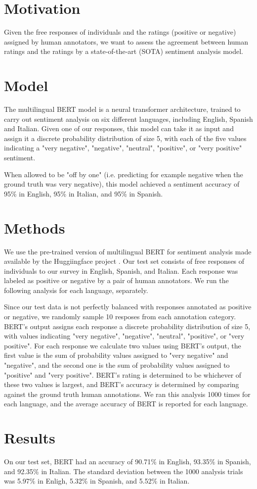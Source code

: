 \documentclass[12pt]{article}
\begin{document}
\maketitle

\section{Motivation}
Given the free responses of individuals and the ratings (positive or negative)
assigned by human annotators, we want to assess the agreement between human ratings and the 
ratings by a state-of-the-art (SOTA) sentiment analysis model.

\section{Model}
The multilingual BERT model \cite{DBLP:journals/corr/abs-1810-04805} is a neural transformer
architecture, trained to carry out sentiment analysis on six different languages, including
English, Spanish and Italian. Given one of our responses, this model can take it as input and assign
it a discrete probability distribution of size 5, with each of the five values indicating 
a "very negative", "negative", "neutral", "positive", or "very positive" sentiment.

When allowed to be "off by one" (i.e. predicting for example negative when the ground truth 
was very negative), this model achieved a sentiment accuracy of 95\% in English, 95\% in Italian, 
and 95\% in Spanish.

\section{Methods}
We use the pre-trained version of multilingual BERT for sentiment analysis made available 
by the Huggiingface project \cite{wolf2019huggingface}. 
Our test set consists of free responses of individuals to our survey in English, Spanish, 
and Italian. Each response was labeled as positive or negative by a pair of human annotators. 
We run the following analysis for each language, separately. 

Since our test data is not perfectly balanced with responses annotated as positive or negative, 
we randomly sample 10 resposes from each annotation category. BERT's output assigns each response
a discrete probability distribution of size 5, with values indicating "very negative", "negative", 
"neutral", "positive", or "very positive". For each response we calculate two values using BERT's
output, the first value is the sum of probability values assigned to "very negative" and 
"negative", and the second one is the sum of probability values assigned to "positive" and 
"very positive". BERT's rating is determined to be whichever of these two values is largest, 
and BERT's accuracy is determined by comparing against the ground truth human annotations. 
We ran this analysis 1000 times for each language, and the average accuracy of BERT is reported 
for each language. 

\section{Results}
On our test set, BERT had an accuracy of 90.71\% in English, 93.35\% in Spanish, and 92.35\% in 
Italian. The standard deviation between the 1000 analysis trials was 5.97\% in Enligh, 5.32\% in 
Spanish, and 5.52\% in Italian. 



\end{document}
